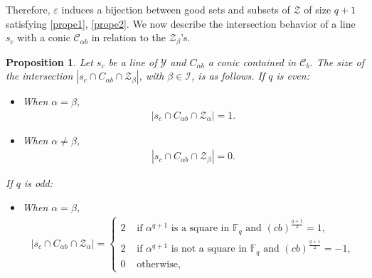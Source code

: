 \documentclass[11pt]{article}
\newtheorem{prop}[theorem]{Proposition}
\theoremstyle{definition}
\numberwithin{equation}{section}
\def\eps{\varepsilon}
\def\cC{\mathscr C}
\def\cI{\mathcal I}
\def\cY{\mathcal Y}
\def\cZ{\mathcal Z}
\def\F{{\mathbb F}}
\begin{document}
Therefore, $\eps$ induces a bijection between good sets and subsets of $\cZ$ of size $q+1$ satisfying \eqref{prope1}, \eqref{prope2}. We now describe the intersection behavior of a line $s_c$ with a conic $\cC_{\alpha b}$ in relation to the $\cZ_{\beta}$'s. 

\begin{prop} \label{prop:geometricintersectiongood}
    Let $s_c$ be a line of $\cY$ and $C_{\alpha b}$ a conic contained in $\cC_b$. The size of the intersection $|s_c \cap C_{\alpha b} \cap \mathcal{Z}_\beta|$, with $\beta \in \cI$, is as follows. If $q$ is even:
    \begin{itemize}
        \item When $\alpha=\beta$, \begin{align*}
        |s_c \cap C_{\alpha b} \cap \cZ_{\alpha}| = 1.
    \end{align*}
    \item When $\alpha \neq \beta$, \begin{align*}
        |s_c \cap C_{\alpha b} \cap \cZ_{\beta}| = 0.
    \end{align*}
    \end{itemize}
If $q$ is odd:
\begin{itemize}
    \item When $\alpha=\beta$,
\begin{align*}
        |s_c \cap C_{\alpha b} \cap \cZ_{\alpha}| = \begin{cases}
            2 & \mbox{ if } \alpha^{q+1} \mbox{ is a square in } \F_{q} \mbox{ and } (cb)^{\frac{q+1}{2}}=1, \\
            2 & \mbox{ if } \alpha^{q+1} \mbox{ is not a square in } \F_{q} \mbox{ and } (cb)^{\frac{q+1}{2}}=-1, \\
            0 & \mbox{ otherwise},
        \end{cases}
    \end{align*}

\end{itemize}
\end{prop}
\end{document}
